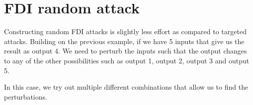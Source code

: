 \section{FDI random attack} 
Constructing random FDI attacks is slightly less effort as compared to targeted attacks.
Building on the previous example, if we have 5 inputs that give us the result as output 4. We need to perturb the inputs such that the output changes to any of the other possibilities such as output 1, output 2, output 3 and output 5.

In this case, we try out multiple different combinations that allow us to find the perturbations. 